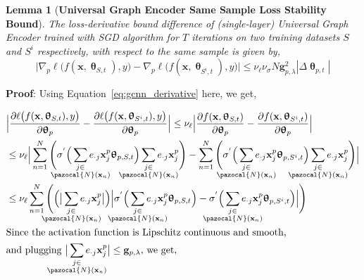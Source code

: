 \documentclass{article}
\newtheorem{lemma}{Lemma}
\newcommand{\Na}{\pazocal{N}}
\begin{document}
\begin{lemma}[\textbf{Universal Graph Encoder    Same Sample Loss Stability Bound}]\label{lemma:sgd_term1}  \textit{The   loss-derivative bound difference   of (single-layer) Universal Graph Encoder    trained with SGD algorithm for $T$ iterations on two training datasets $S$ and $S^i$ respectively, with respect to the same sample     is given by,}
	$$ \Big|   \nabla_{p} \ell\big(f(\mathbf{x},\bm{\uptheta}_{S, t} ),y \big)   -      \nabla_{p} \ell\big(f(\mathbf{x},\bm{\uptheta}_{S^{i}, t} ),y \big)   \Big| \leq \nu_{\ell}  \nu_{\sigma} N \mathbf{g}_{p, \lambda}^2  |   \Delta\bm{\uptheta}_{p, t}|  $$
\end{lemma}
\noindent \textbf{Proof}:  Using Equation~\ref{eq:gcnn_derivative} here, we get,	

\begin{equation} 	
\begin{split}
& \Big|   \frac{\partial \ell\big(f(\mathbf{x},\bm{\uptheta}_{S, t} ),y \big)}{\partial \bm{\uptheta}_{p} }    -      \frac{\partial \ell \big(f(\mathbf{x},\bm{\uptheta}_{S^{i}, t} ),y \big)}{\partial \bm{\uptheta}_{p} }     \Big| \nonumber \leq   \nu_{\ell} \Big| \frac{\partial f(\mathbf{x},\bm{\uptheta}_{S, t} )}{\partial \bm{\uptheta}_{p} }     -  \frac{\partial f(\mathbf{x},\bm{\uptheta}_{S^{i}, t} )}{\partial \bm{\uptheta}_{p} }   \Big|  \\
& \leq \nu_{\ell} \Big|  \sum_{n=1}^{N} \Bigg( \sigma^{'}\Big( \sum_{\mathclap{\substack{j\in \\ \Na(\mathbf{x}_n)}}}  e_{\cdot j}  \mathbf{x}^{p}_{j}  \bm{\uptheta}_{p, S, t} \Big)  \sum_{\mathclap{\substack{j\in \\ \Na(\mathbf{x}_n) }}}  e_{\cdot j}  \mathbf{x}^{p}_{j}  \Bigg) -  \sum_{n=1}^{N}  \Bigg( \sigma^{'}\Big( \sum_{\mathclap{\substack{j\in \\ \Na(\mathbf{x}_n)}}}  e_{\cdot j}  \mathbf{x}^{p}_{j}  \bm{\uptheta}_{p, S^{i}, t} \Big)  \sum_{\mathclap{\substack{j\in \\ \Na(\mathbf{x}_n) }}}  e_{\cdot j}  \mathbf{x}^{p}_{j}   \Bigg) \Big|  \\
& \leq \nu_{\ell} \sum_{n=1}^{N}  \Bigg( \Big( \big| \sum_{\mathclap{\substack{j\in \\ \Na(\mathbf{x}_n) }}}  e_{\cdot j}  \mathbf{x}^{p}_{j} \big|  \Big) \Big|   \sigma^{'}\Big( \sum_{\mathclap{\substack{j\in \\ \Na(\mathbf{x}_n)}}}  e_{\cdot j}  \mathbf{x}^{p}_{j}  \bm{\uptheta}_{p, S, t} \Big)   -    \sigma^{'}\Big( \sum_{\mathclap{\substack{j\in \\ \Na(\mathbf{x}_n)}}}  e_{\cdot j}  \mathbf{x}^{p}_{j}  \bm{\uptheta}_{p, S^{i}, t} \Big)    \Big| \Bigg)  \\
& \text{Since the activation function is    Lipschitz continuous and smooth,  } \\
& \text{and plugging  $\big| \sum_{\mathclap{\substack{j\in \\ \Na(\mathbf{x}_n) }}}  e_{\cdot j}  \mathbf{x}^{p}_{j} \big| \leq \mathbf{g}_{p,\lambda}$, we get,  } \\
\end{split}
\end{equation}
\end{document}
